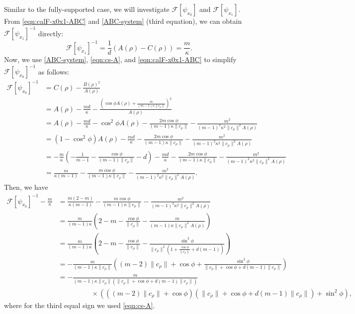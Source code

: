 \documentclass[11pt]{amsart}
\newcommand{\dm}{d} %
\begin{document}
Similar to the fully-supported case, we will investigate $\mathcal{F}[\psi_{x_0}]$ and $\mathcal{F}[\psi_{x_1}]$. From \eqref{eqn:calF-x0x1-ABC} and \eqref{ABC-system} (third equation), we can obtain $\mathcal{F}[\psi_{x_1}]^{-1}$ directly:
\[
\mathcal{F}[\psi_{x_1}]^{-1}=\frac{1}{\dm}\left(A(\rho)-C(\rho)\right)=\frac{m}{\kappa}.
\]
Now, we use \eqref{ABC-system}, \eqref{eqn:cs-A}, and \eqref{eqn:calF-x0x1-ABC} to simplify $\mathcal{F}[\psi_{x_0}]^{-1}$ as follows:
\begin{align*}
\mathcal{F}[\psi_{x_0}]^{-1}&=C(\rho)-\frac{B(\rho)^2}{A(\rho)}\\
&=A(\rho)-\frac{m\dm}{\kappa}-\frac{\left(\cos\phi A(\rho)+\frac{m}{(m-1)\kappa \|c_\rho\|}\right)^2}{A(\rho)}\\
&=A(\rho)-\frac{m\dm}{\kappa}-\cos^2\phi A(\rho)-\frac{2m \cos\phi }{(m-1)\kappa \|c_\rho\|}-\frac{m^2}{(m-1)^2\kappa^2 \|c_\rho\|^2 A(\rho)}\\
&=(1-\cos^2\phi)A(\rho)-\frac{m\dm}{\kappa}-\frac{2m\cos\phi }{(m-1)\kappa \|c_\rho\|}-\frac{m^2}{(m-1)^2\kappa^2 \|c_\rho\|^2 A(\rho)}\\
&=-\frac{m}{\kappa}\left(-\frac{1}{m-1}-\frac{\cos\phi}{(m-1)\|c_\rho\|}-\dm\right)-\frac{m\dm}{\kappa}-\frac{2m \cos\phi }{(m-1)\kappa \|c_\rho\|}-\frac{m^2}{(m-1)^2\kappa^2 \|c_\rho\|^2 A(\rho)}\\
&=\frac{m}{\kappa(m-1)}-\frac{m \cos\phi }{(m-1)\kappa \|c_\rho\|}-\frac{m^2}{(m-1)^2\kappa^2 \|c_\rho\|^2 A(\rho)}.
\end{align*}
Then, we have
\begin{align*}
\mathcal{F}[\psi_{x_0}]^{-1}-\frac{m}{\kappa}&=\frac{m(2-m)}{\kappa(m-1)}-\frac{m \cos\phi }{(m-1)\kappa \|c_\rho\|}-\frac{m^2}{(m-1)^2\kappa^2 \|c_\rho\|^2 A(\rho)}\\
&=\frac{m}{(m-1)\kappa}\left(2-m-\frac{\cos\phi}{\|c_\rho\|}-\frac{m}{(m-1)\kappa \|c_\rho\|^2 A(\rho)}\right)\\
&=\frac{m}{(m-1)\kappa}\left(2-m-\frac{\cos\phi}{\|c_\rho\|}-\frac{\sin^2 \phi}{ \|c_\rho\|^2 \left(1+\frac{\cos\phi}{\|c_\rho\|}+\dm(m-1)\right)}\right)\\
&=-\frac{m}{(m-1)\kappa \|c_\rho\|}\left((m-2) \| c_\rho \|+\cos\phi+\frac{\sin^2 \phi}{ \|c_\rho\|+\cos\phi+\dm(m-1)\|c_\rho\|}\right)\\
&=-\frac{m}{(m-1)\kappa \|c_\rho\|(\|c_\rho\|+\cos\phi+ \dm(m-1)\|c_\rho\|)}\\[5pt]
&\hspace{2cm}\times\left(((m-2)\|c_\rho\|+\cos\phi)(\|c_\rho\|+\cos\phi+\dm(m-1)\|c_\rho\|)+\sin^2\phi\right),
\end{align*}
where for the third equal sign we used \eqref{eqn:cs-A}.
\end{document}
